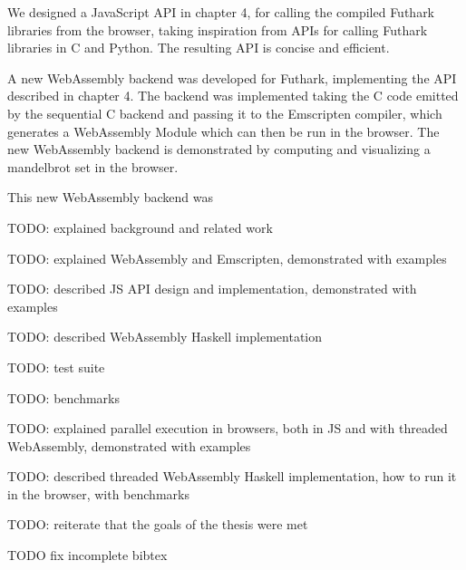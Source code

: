 \documentclass[11pt]{book}
\begin{document}
We designed a JavaScript API in chapter 4, for calling the compiled Futhark libraries from the browser, taking inspiration from APIs for calling Futhark libraries in C and Python. The resulting API is concise and efficient.

A new WebAssembly backend was developed for Futhark, implementing the API described in chapter 4. The backend was implemented taking the C code emitted by the sequential C backend and passing it to the Emscripten compiler, which generates a WebAssembly Module which can then be run in the browser. The new WebAssembly backend is demonstrated by computing and visualizing a mandelbrot set in the browser.

This new WebAssembly backend was 





{\color{red} TODO}: explained background and related work

{\color{red} TODO}: explained WebAssembly and Emscripten, demonstrated with examples

{\color{red} TODO}: described JS API design and implementation, demonstrated with examples

{\color{red} TODO}: described WebAssembly Haskell implementation

{\color{red} TODO}: test suite

{\color{red} TODO}: benchmarks

{\color{red} TODO}: explained parallel execution in browsers, both in JS and with threaded WebAssembly, demonstrated with examples

{\color{red} TODO}: described threaded WebAssembly Haskell implementation, how to run it in the browser, with benchmarks

{\color{red} TODO}: reiterate that the goals of the thesis were met


{\color{red} TODO} fix incomplete bibtex
\end{document}
